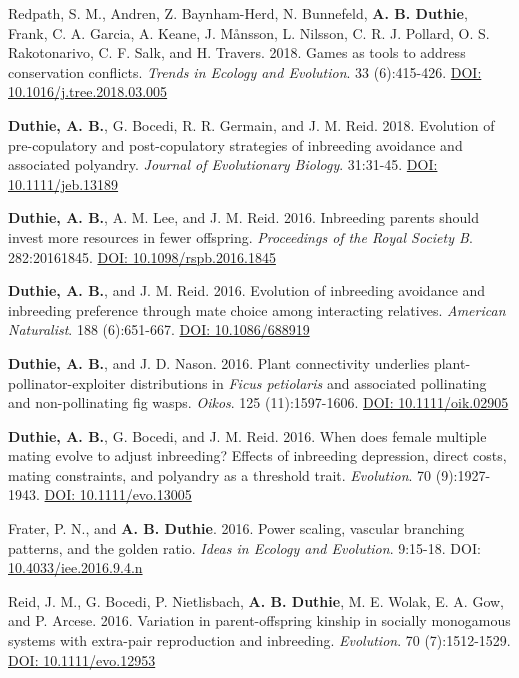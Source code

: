 \documentclass[letterpaper]{article}
\begin{document}
\begin{etaremune}
\item Redpath, S. M., Andren, Z. Baynham-Herd, N. Bunnefeld, {\bf A. B. Duthie}, Frank, C. A. Garcia, A. Keane, J. M\r{a}nsson, L. Nilsson, C. R. J. Pollard, O. S. Rakotonarivo, C. F. Salk, and H. Travers. 2018. Games as tools to address conservation conflicts. {\it Trends in Ecology and Evolution}. 33 (6):415-426. \href{https://www.cell.com/trends/ecology-evolution/fulltext/S0169-5347(18)30059-4}{DOI: 10.1016/j.tree.2018.03.005}
\item {\bf Duthie, A. B.}, G. Bocedi, R. R. Germain, and J. M. Reid. 2018. Evolution of pre-copulatory and post-copulatory strategies of inbreeding avoidance and associated polyandry. {\it Journal of Evolutionary Biology}. 31:31-45. \href{https://onlinelibrary.wiley.com/doi/10.1111/jeb.13189/full}{DOI: 10.1111/jeb.13189}
\item {\bf Duthie, A. B.}, A. M. Lee, and J. M. Reid. 2016. Inbreeding parents should invest more resources in fewer offspring. {\it Proceedings of the Royal Society B}. 282:20161845. \href{http://rspb.royalsocietypublishing.org/content/283/1843/20161845}{DOI: 10.1098/rspb.2016.1845}
\item {\bf Duthie, A. B.}, and J. M. Reid. 2016. Evolution of inbreeding avoidance and inbreeding preference through mate choice among interacting relatives. {\it American Naturalist}. 188 (6):651-667. \href{http://www.journals.uchicago.edu/doi/full/10.1086/688919}{DOI: 10.1086/688919}
\item {\bf Duthie, A. B.}, and J. D. Nason. 2016. Plant connectivity underlies plant-pollinator-exploiter distributions in {\it Ficus petiolaris} and associated pollinating and non-pollinating fig wasps. {\it Oikos}. 125 (11):1597-1606. \href{http://onlinelibrary.wiley.com/doi/10.1111/oik.02905/abstract}{DOI: 10.1111/oik.02905}
\item {\bf Duthie, A. B.}, G. Bocedi, and J. M. Reid. 2016. When does female multiple mating evolve to adjust inbreeding? Effects of inbreeding depression, direct costs, mating constraints, and polyandry as a threshold trait. {\it Evolution}. 70 (9):1927-1943. \href{http://onlinelibrary.wiley.com/doi/10.1111/evo.13005/abstract}{DOI: 10.1111/evo.13005}
\item Frater, P. N., and {\bf A. B. Duthie}. 2016. Power scaling, vascular branching patterns, and the golden ratio. {\it Ideas in Ecology and Evolution}. 9:15-18. DOI: \href{http://ojs.library.queensu.ca/index.php/IEE/article/view/6312}{10.4033/iee.2016.9.4.n}
\item Reid, J. M., G. Bocedi, P. Nietlisbach, {\bf A. B. Duthie}, M. E. Wolak, E. A. Gow, and P. Arcese. 2016. Variation in parent-offspring kinship in socially monogamous systems with extra-pair reproduction and inbreeding. {\it Evolution}. 70 (7):1512-1529. \href{http://onlinelibrary.wiley.com/doi/10.1111/evo.12953/abstract}{DOI: 10.1111/evo.12953}

\end{etaremune}
\end{document}
